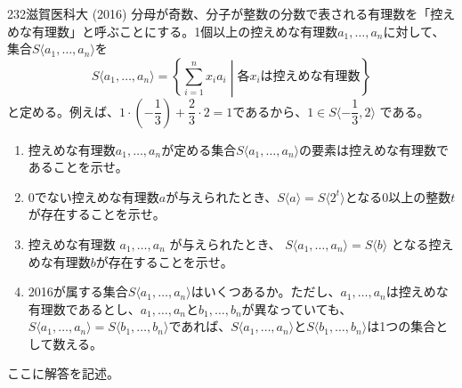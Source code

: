 \begin{thm}{232}{}{滋賀医科大 (2016)}
 分母が奇数、分子が整数の分数で表される有理数を「控えめな有理数」と呼ぶことにする。1個以上の控えめな有理数$a_1,\dots,a_n$に対して、集合$S\langle a_1,\dots, a_n \rangle$を
\[ S\langle a_1,\dots,a_n\rangle=\left\{\sum_{i=1}^n x_ia_i \middle| \text{各$x_i$は控えめな有理数}\right\} \]
 と定める。例えば、$1\cdot\left(-\dfrac{1}{3}\right)+\dfrac{2}{3}\cdot 2=1$であるから、$1\in S\langle -\dfrac{1}{3},2\rangle$ である。
 \begin{enumerate}
  \item 控えめな有理数$a_1,\dots, a_n$が定める集合$S\langle a_1,\dots,a_n\rangle$の要素は控えめな有理数であることを示せ。
  \item 0でない控えめな有理数$a$が与えられたとき、$S\langle a\rangle=S\langle 2^t \rangle$となる0以上の整数$t$が存在することを示せ。
  \item 控えめな有理数 $a_1,\dots,a_n$ が与えられたとき、 $S\langle a_1,\dots,a_n\rangle=S\langle b\rangle$ となる控えめな有理数$b$が存在することを示せ。
  \item 2016が属する集合$S\langle a_1,\dots,a_n\rangle$はいくつあるか。ただし、$a_1,\dots,a_n$は控えめな有理数であるとし、$a_1,\dots,a_n$と$b_1,\dots,b_n$が異なっていても、$S\langle a_1,\dots,a_n\rangle =S\langle b_1,\dots,b_n\rangle$であれば、$S\langle a_1,\dots,a_n\rangle$と$S\langle b_1,\dots,b_n\rangle$は1つの集合として数える。
 \end{enumerate}
\end{thm}

ここに解答を記述。
